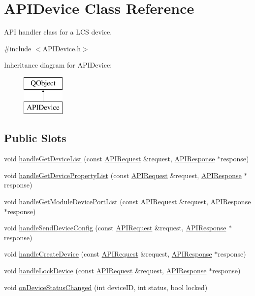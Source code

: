 \hypertarget{class_a_p_i_device}{}\section{A\+P\+I\+Device Class Reference}
\label{class_a_p_i_device}


A\+PI handler class for a L\+CS device.  




{\ttfamily \#include $<$A\+P\+I\+Device.\+h$>$}

Inheritance diagram for A\+P\+I\+Device\+:\begin{figure}[H]
\begin{center}
\leavevmode
\includegraphics[height=2.000000cm]{class_a_p_i_device}
\end{center}
\end{figure}
\subsection*{Public Slots}
\begin{DoxyCompactItemize}
\item 
void \hyperlink{class_a_p_i_device_a1e74a10d605557654fe5be02a9db87ab}{handle\+Get\+Device\+List} (const \hyperlink{class_a_p_i_request}{A\+P\+I\+Request} \&request, \hyperlink{class_a_p_i_response}{A\+P\+I\+Response} $\ast$response)
\item 
void \hyperlink{class_a_p_i_device_a5be87488af611d8ef61501a07e4a39d9}{handle\+Get\+Device\+Property\+List} (const \hyperlink{class_a_p_i_request}{A\+P\+I\+Request} \&request, \hyperlink{class_a_p_i_response}{A\+P\+I\+Response} $\ast$response)
\item 
void \hyperlink{class_a_p_i_device_ad5a4f48e5cf4767426fd179446501c53}{handle\+Get\+Module\+Device\+Port\+List} (const \hyperlink{class_a_p_i_request}{A\+P\+I\+Request} \&request, \hyperlink{class_a_p_i_response}{A\+P\+I\+Response} $\ast$response)
\item 
void \hyperlink{class_a_p_i_device_a794458df71d6f24a8b8dccbbdf9235da}{handle\+Send\+Device\+Config} (const \hyperlink{class_a_p_i_request}{A\+P\+I\+Request} \&request, \hyperlink{class_a_p_i_response}{A\+P\+I\+Response} $\ast$response)
\item 
void \hyperlink{class_a_p_i_device_aabc5cc49832ebe6779cf70c1b38ad4c9}{handle\+Create\+Device} (const \hyperlink{class_a_p_i_request}{A\+P\+I\+Request} \&request, \hyperlink{class_a_p_i_response}{A\+P\+I\+Response} $\ast$response)
\item 
void \hyperlink{class_a_p_i_device_a9fa95a9f88e738477ed5e32e22ae6990}{handle\+Lock\+Device} (const \hyperlink{class_a_p_i_request}{A\+P\+I\+Request} \&request, \hyperlink{class_a_p_i_response}{A\+P\+I\+Response} $\ast$response)
\item 
void \hyperlink{class_a_p_i_device_a4424a0e2b44177c7b3af3b9fd9aca875}{on\+Device\+Status\+Changed} (int device\+ID, int status, bool locked)
\end{DoxyCompactItemize}
